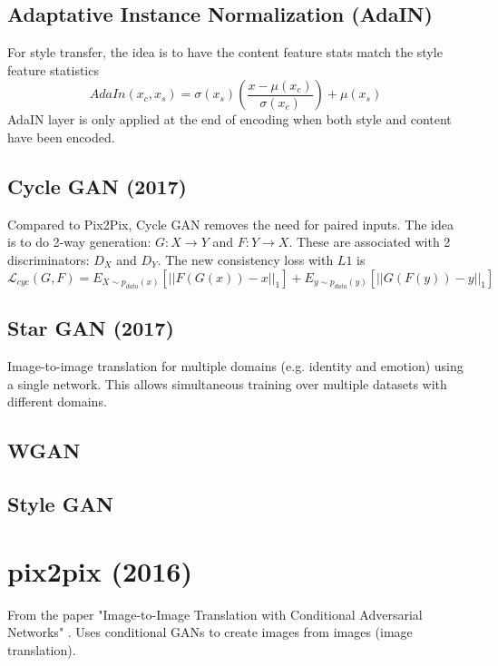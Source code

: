 \documentclass[../main.tex]{subfiles}
\begin{document}
\subsection{Adaptative Instance Normalization (AdaIN)}
For style transfer, the idea is to have the content feature stats match the style feature statistics
\begin{equation}
    AdaIn(x_c, x_s) = \sigma(x_s) \left( \frac{x - \mu(x_c)}{\sigma(x_c)} \right) + \mu(x_s)
\end{equation}
AdaIN layer is only applied at the end of encoding when both style and content have been encoded.


\subsection{Cycle GAN (2017)}
Compared to Pix2Pix, Cycle GAN removes the need for paired inputs. The idea is to do 2-way generation:
$G: X \to Y$ and $F: Y \to X$. These are associated with 2 discriminators: $D_X$ and $D_Y$.
The new consistency loss with $L1$ is
\begin{equation}
    \mathcal{L}_{cyc}(G, F) = E_{X\sim p_{data}(x)} \left[ || F(G(x)) - x ||_1\right]
        + E_{y\sim p_{data}(y)} \left[ || G(F(y)) - y ||_1\right]
\end{equation}

\subsection{Star GAN (2017)}
Image-to-image translation for multiple domains (e.g. identity and emotion) using a single network.
This allows simultaneous training over multiple datasets with different domains.

\subsection{WGAN}

\subsection{Style GAN}


\section{pix2pix (2016)}
From the paper "Image-to-Image Translation with Conditional Adversarial Networks" \cite{pix-to-pix}.
Uses conditional GANs to create images from images (image translation).
\end{document}

